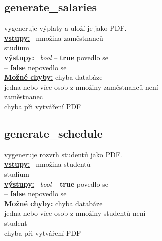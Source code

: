 \documentclass[a4paper, 11pt, twocolumn]{article}
\begin{document}
\vfill

\subsection{generate\_salaries}\label{generateux5fsalaries}
vygeneruje výplaty a uloží je jako PDF. \\
\noindent \underline{\textbf{vstupy:}} \, množina zaměstnanců  \\
\noindent \hspace*{1.4cm} studium \\
\noindent \underline{\textbf{výstupy:}} \, \textit{bool} -- \textbf{true} povedlo se \\
\hspace*{2.35cm} -- \textbf{false} nepovedlo se  \\
\underline{\textbf{Možné chyby:}} chyba databáze \\
\hspace*{1.4cm} jedna nebo více osob z množiny zaměstnanců není \\
\hspace*{2cm} zaměstnanec \\
\hspace*{1.4cm} chyba při vytváření PDF

\subsection{generate\_schedule}\label{generateux5fschedule}
\vspace*{-0.3cm}
vygeneruje rozvrh studentů jako PDF. \\
\noindent \underline{\textbf{vstupy:}} \, množina studentů  \\
\noindent \hspace*{1.4cm} studium \\
\noindent \underline{\textbf{výstupy:}} \, \textit{bool} -- \textbf{true} povedlo se \\
\hspace*{2.35cm} -- \textbf{false} nepovedlo se  \\
\underline{\textbf{Možné chyby:}} chyba databáze \\
\hspace*{1.4cm} jedna nebo více osob z množiny studentů není \\
\hspace*{2cm} student \\
\hspace*{1.4cm} chyba při vytváření PDF
\end{document}
